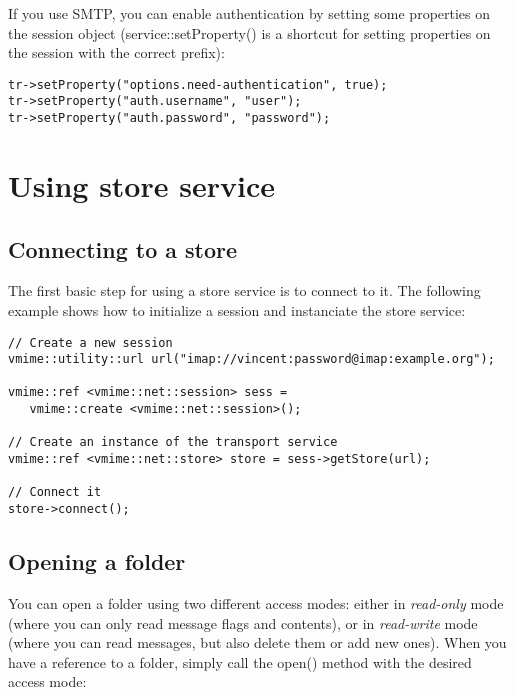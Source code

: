 If you use SMTP, you can enable authentication by setting some properties
on the session object ({\vcode service::setProperty()} is a shortcut for
setting properties on the session with the correct prefix):

\begin{lstlisting}
tr->setProperty("options.need-authentication", true);
tr->setProperty("auth.username", "user");
tr->setProperty("auth.password", "password");
\end{lstlisting}


\section{Using store service}

\subsection{Connecting to a store} %

The first basic step for using a store service is to connect to it. The
following example shows how to initialize a session and instanciate the
store service:

\begin{lstlisting}[caption={Connecting to a store service}]
// Create a new session
vmime::utility::url url("imap://vincent:password@imap:example.org");

vmime::ref <vmime::net::session> sess =
   vmime::create <vmime::net::session>();

// Create an instance of the transport service
vmime::ref <vmime::net::store> store = sess->getStore(url);

// Connect it
store->connect();
\end{lstlisting}


\subsection{Opening a folder} %

You can open a folder using two different access modes: either in
\emph{read-only} mode (where you can only read message flags and contents), or
in \emph{read-write} mode (where you can read messages, but also delete them
or add new ones). When you have a reference to a folder, simply call the
{\vcode open()} method with the desired access mode:

